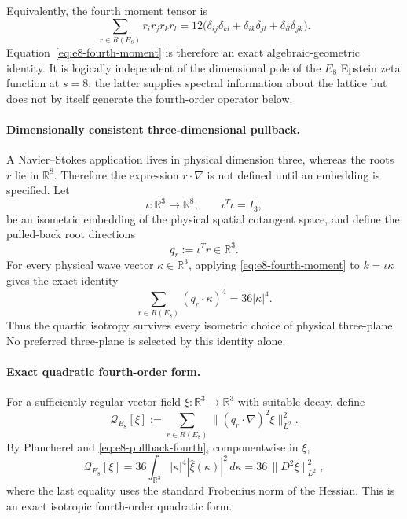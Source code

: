 \documentclass{article}
\begin{document}
Equivalently, the fourth moment tensor is
\begin{equation}
\sum_{r\in R(E_8)}r_i r_j r_k r_l
=12\bigl(\delta_{ij}\delta_{kl}
        +\delta_{ik}\delta_{jl}
        +\delta_{il}\delta_{jk}\bigr).
\label{eq:e8-fourth-tensor}
\end{equation}
Equation~\eqref{eq:e8-fourth-moment} is therefore an exact algebraic-geometric
identity.  It is logically independent of the dimensional pole of the
$E_8$ Epstein zeta function at $s=8$; the latter supplies spectral information
about the lattice but does not by itself generate the fourth-order operator
below.

\paragraph{Dimensionally consistent three-dimensional pullback.}
A Navier--Stokes application lives in physical dimension three, whereas the
roots $r$ lie in $\mathbb R^8$.  Therefore the expression $r\cdot\nabla$ is not
defined until an embedding is specified.  Let
\begin{equation}
\iota:\mathbb R^3\longrightarrow\mathbb R^8,
\qquad \iota^T\iota=I_3,
\end{equation}
be an isometric embedding of the physical spatial cotangent space, and define
the pulled-back root directions
\begin{equation}
q_r:=\iota^T r\in\mathbb R^3.
\end{equation}
For every physical wave vector $\kappa\in\mathbb R^3$, applying
\eqref{eq:e8-fourth-moment} to $k=\iota\kappa$ gives the exact identity
\begin{equation}
\boxed{
\sum_{r\in R(E_8)}(q_r\cdot\kappa)^4
=36|\kappa|^4.
}
\label{eq:e8-pullback-fourth}
\end{equation}
Thus the quartic isotropy survives every isometric choice of physical
three-plane.  No preferred three-plane is selected by this identity alone.

\paragraph{Exact quadratic fourth-order form.}
For a sufficiently regular vector field $\xi:\mathbb R^3\to\mathbb R^3$ with
suitable decay, define
\begin{equation}
\mathcal Q_{E_8}[\xi]
:=\sum_{r\in R(E_8)}
\bigl\|(q_r\cdot\nabla)^2\xi\bigr\|_{L^2}^2.
\end{equation}
By Plancherel and \eqref{eq:e8-pullback-fourth}, componentwise in $\xi$,
\begin{equation}
\boxed{
\mathcal Q_{E_8}[\xi]
=36\int_{\mathbb R^3}|\kappa|^4|\widehat\xi(\kappa)|^2\,d\kappa
=36\,\|D^2\xi\|_{L^2}^2,
}
\label{eq:e8-h2-form}
\end{equation}
where the last equality uses the standard Frobenius norm of the Hessian.  This
is an exact isotropic fourth-order quadratic form.
\end{document}

